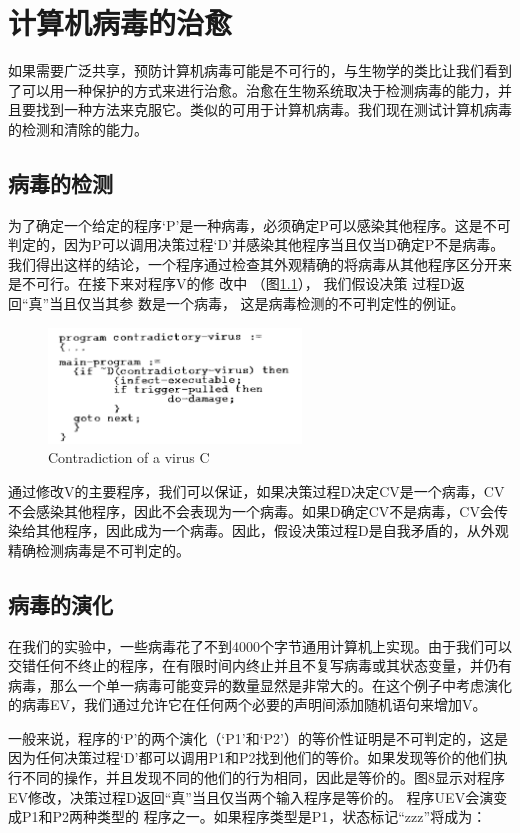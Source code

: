 \chapter{计算机病毒的治愈}

如果需要广泛共享，预防计算机病毒可能是不可行的，与生物学的类比让我们看到了可以用一种保护的方式来进行治愈。治愈在生物系统取决于检测病毒的能力，并且要找到一种方法来克服它。类似的可用于计算机病毒。我们现在测试计算机病毒的检测和清除的能力。

\section{病毒的检测}

为了确定一个给定的程序‘P’是一种病毒，必须确定P可以感染其他程序。这是不可判定的，因为P可以调用决策过程‘D’并感染其他程序当且仅当D确定P不是病毒。我们得出这样的结论，一个程序通过检查其外观精确的将病毒从其他程序区分开来是不可行。在接下来对程序V的修
改中
（图\ref{fig6}），
我们假设决策
过程D返回“真”当且仅当其参
数是一个病毒，
这是病毒检测的不可判定性的例证。


\begin{figure}[h!]
    \centering
    \includegraphics[width=0.60\textwidth]{figure/fig6.png}
    \caption{Contradiction of a virus C} 
    \label{fig6}
\end{figure} 
通过修改V的主要程序，我们可以保证，如果决策过程D决定CV是一个病毒，CV不会感染其他程序，因此不会表现为一个病毒。如果D确定CV不是病毒，CV会传染给其他程序，因此成为一个病毒。因此，假设决策过程D是自我矛盾的，从外观精确检测病毒是不可判定的。


\section{病毒的演化}

在我们的实验中，一些病毒花了不到4000个字节通用计算机上实现。由于我们可以交错任何不终止的程序，在有限时间内终止并且不复写病毒或其状态变量，并仍有病毒，那么一个单一病毒可能变异的数量显然是非常大的。在这个例子中考虑演化的病毒EV，我们通过允许它在任何两个必要的声明间添加随机语句来增加V。

一般来说，程序的‘P’的两个演化（‘P1’和‘P2’）的等价性证明是不可判定的，这是因为任何决策过程‘D’都可以调用P1和P2找到他们的等价。如果发现等价的他们执行不同的操作，并且发现不同的他们的行为相同，因此是等价的。图8显示对程序EV修改，决策过程D返回“真”当且仅当两个输入程序是等价的。
程序UEV会演变成P1和P2两种类型的
程序之一。如果程序类型是P1，状态标记“zzz”将成为：


